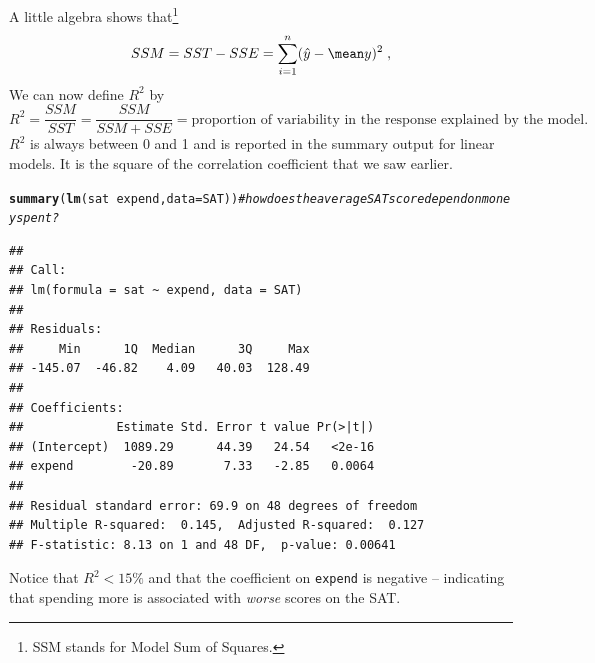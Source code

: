 \documentclass[twoside]{book}\usepackage[]{graphicx}\usepackage[]{xcolor}
\makeatletter
\newcommand{\hlcom}[1]{\textcolor[rgb]{0.678,0.584,0.686}{\textit{#1}}}%
\newcommand{\hlopt}[1]{\textcolor[rgb]{0,0,0}{#1}}%
\newcommand{\hlstd}[1]{\textcolor[rgb]{0.345,0.345,0.345}{#1}}%
\newcommand{\hlkwc}[1]{\textcolor[rgb]{0.333,0.667,0.333}{#1}}%
\newcommand{\hlkwd}[1]{\textcolor[rgb]{0.737,0.353,0.396}{\textbf{#1}}}%
\newenvironment{kframe}{%
 \def\at@end@of@kframe{}%
 \ifinner\ifhmode%
  \def\at@end@of@kframe{\end{minipage}}%
  \begin{minipage}{\columnwidth}%
 \fi\fi%
 \def\FrameCommand##1{\hskip\@totalleftmargin \hskip-\fboxsep
 \colorbox{shadecolor}{##1}\hskip-\fboxsep
     \hskip-\linewidth \hskip-\@totalleftmargin \hskip\columnwidth}%
 \MakeFramed {\advance\hsize-\width
   \@totalleftmargin\z@ \linewidth\hsize
   \@setminipage}}%
 {\par\unskip\endMakeFramed%
 \at@end@of@kframe}
\newenvironment{knitrout}{}{} %
\newcommand{\variable}[1]{{\color{green!50!black}\texttt{#1}}}
\makeatother
\begin{document}
A little algebra shows that\footnote{SSM stands for Model Sum of Squares.}
\[
SSM = SST - SSE = 
\sum_{i = 1}^{n} ( \hat y - \mean y)^2 \;,
\]
We can now define $R^2$ by
\[
R^2 = \frac{SSM}{SST}  = \frac{SSM}{ SSM + SSE }
= \mbox{proportion of variability in the response explained by the model.}
\]
$R^2$ is always between 0 and 1 and is reported in the summary output
for linear models.  It is the square of the correlation coefficient
that we saw earlier.
\begin{knitrout}
\color{fgcolor}\begin{kframe}
\begin{alltt}
\hlkwd{summary}\hlstd{(}\hlkwd{lm}\hlstd{(sat} \hlopt{~} \hlstd{expend,} \hlkwc{data} \hlstd{= SAT))}  \hlcom{# how does the average SAT score depend on money spent?}
\end{alltt}
\begin{verbatim}
## 
## Call:
## lm(formula = sat ~ expend, data = SAT)
## 
## Residuals:
##     Min      1Q  Median      3Q     Max 
## -145.07  -46.82    4.09   40.03  128.49 
## 
## Coefficients:
##             Estimate Std. Error t value Pr(>|t|)
## (Intercept)  1089.29      44.39   24.54   <2e-16
## expend        -20.89       7.33   -2.85   0.0064
## 
## Residual standard error: 69.9 on 48 degrees of freedom
## Multiple R-squared:  0.145,	Adjusted R-squared:  0.127 
## F-statistic: 8.13 on 1 and 48 DF,  p-value: 0.00641
\end{verbatim}
\end{kframe}
\end{knitrout}
Notice that $R^2 < 15\%$ and that the coefficient on \variable{expend} is negative -- indicating 
that spending more is associated with \emph{worse} scores on the SAT.
\end{document}
